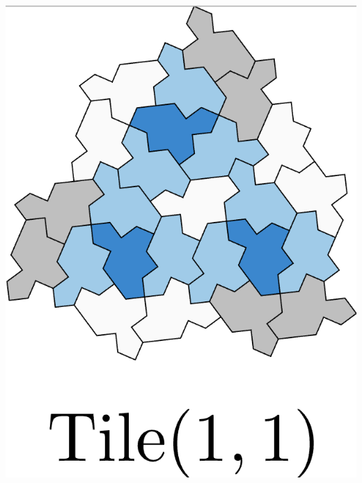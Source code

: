 \documentclass[class=beamer, crop=false]{standalone}
\begin{document}
\begin{minipage}{0.24\textwidth}
\begin{minipage}[t]{0.24\textwidth}
    \includegraphics[width=\linewidth]{images/polykite-family/tile(1,1).png}
  \end{minipage}



\end{minipage}
\end{document}
